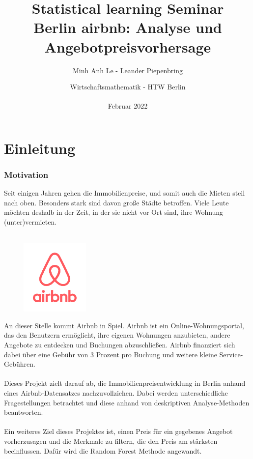 \documentclass[12pt]{article}
\title{Statistical learning Seminar\\Berlin airbnb: Analyse und Angebotpreisvorhersage }
\author{Minh Anh Le - Leander Piepenbring  }
\date{Wirtschaftsmathematik - HTW Berlin\\\\Februar 2022 }
\begin{document}
\setcounter{tocdepth}{1}
\newpage
\maketitle
\newpage
\tableofcontents
\newpage
\listoffigures   
\newpage
\part{Einleitung}
\section{Motivation}
\begin{text}

Seit einigen Jahren gehen die Immobilienpreise, und somit auch die Mieten steil nach oben. Besonders stark sind davon große Städte betroffen. Viele Leute möchten deshalb in der Zeit, in der sie nicht vor Ort sind, ihre Wohnung (unter)vermieten.
\\\\
\begin{figure}
\includegraphics[width=0.3\textwidth]{airbnb_lockup_web.png}
\end{figure}
An dieser Stelle kommt Airbnb in Spiel. Airbnb ist ein Online-Wohnungsportal, das den Benutzern ermöglicht, ihre eigenen Wohnungen anzubieten, andere Angebote zu entdecken und Buchungen abzuschließen. Airbnb finanziert sich dabei über eine Gebühr von 3 Prozent pro Buchung und weitere kleine Service-Gebühren.
\\\\
Dieses Projekt zielt darauf ab, die Immobilienpreisentwicklung in Berlin anhand eines Airbnb-Datensatzes nachzuvollziehen. Dabei werden unterschiedliche Fragestellungen betrachtet und diese anhand von deskriptiven Analyse-Methoden beantworten.
\\\\
Ein weiteres Ziel dieses Projektes ist, einen Preis für ein gegebenes Angebot vorherzusagen und die Merkmale zu filtern, die den Preis am stärksten beeinflussen. Dafür wird die Random Forest Methode angewandt.





\end{text}
\end{document}
